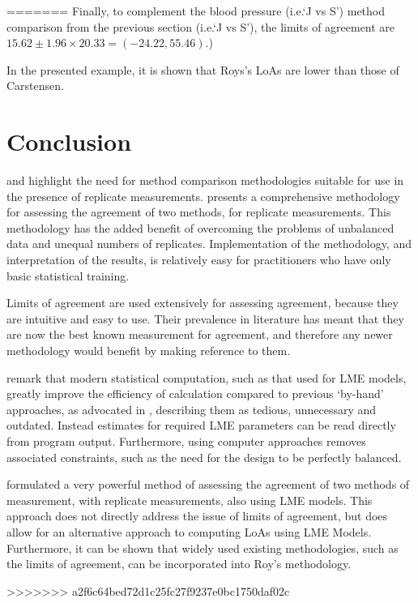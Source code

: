 \documentclass[12pt, a4paper]{report}
\theoremstyle{plain}
\theoremstyle{definition}
\theoremstyle{remark}
\begin{document}
	
	
	
=======
Finally, to complement the blood pressure (i.e.`J vs S') method comparison from the previous section (i.e.`J vs S'), the limits of agreement are $15.62 \pm 1.96 \times 20.33 = (-24.22, 55.46)$.)

In the presented example, it is shown that Roys's LoAs are lower than those of Carstensen.



\section{Conclusion}
\citet{BXC2008} and \citet{ARoy2009} highlight the need for method comparison methodologies suitable for use in the presence of replicate measurements. \citet{ARoy2009} presents a comprehensive methodology for assessing the agreement of two methods, for replicate measurements. This methodology has the added benefit of overcoming the problems of unbalanced data and unequal numbers of replicates. Implementation of the methodology, and interpretation of the results, is relatively easy for practitioners who have only basic statistical training. 

Limits of agreement are used extensively for assessing agreement, because they are intuitive and easy to use. Their prevalence in literature has meant that they are now the best known measurement for agreement, and therefore any newer methodology would benefit by making reference to them.

\citet{BXC2008} remark that modern statistical computation, such as that used for LME models, greatly improve the efficiency of calculation compared to previous `by-hand' approaches, as advocated in \citet{BA99}, describing them as tedious, unnecessary and outdated. Instead estimates for required LME parameters can be read directly from program output. Furthermore, using computer approaches removes associated constraints, such as the need for the design to be perfectly balanced.

\citet{ARoy2009} formulated a very powerful method of assessing the agreement of two methods of measurement, with replicate measurements, also using LME models. This approach does not directly address the issue of limits of agreement, but does allow for an alternative approach to computing LoAs using LME Models.
 Furthermore, it can be shown that widely used existing methodologies, such as the limits of agreement, can be incorporated into Roy's methodology.







>>>>>>> a2f6c64bed72d1c25fc27f9237e0bc1750daf02c
\end{document}
